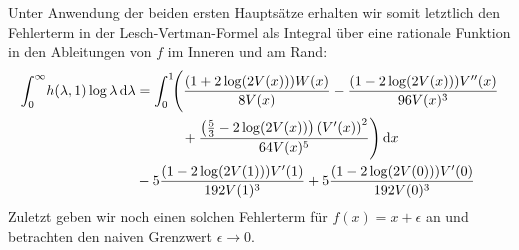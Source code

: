 Unter Anwendung der beiden ersten Hauptsätze erhalten wir somit letztlich den
Fehlerterm in der Lesch-Vertman-Formel als Integral über eine rationale Funktion
in den Ableitungen von $f$ im Inneren und am Rand:
\begin{align*}
  \Integ[\infty]{0}{\lambda}{
    h(\lambda, 1) \log\lambda
  }
  &=
  \Int{x}{\Biggl(\frac{(1 + 2 \log(2 V(x))) W(x)}{8 V(x)}
    - \frac{ (1 - 2 \log(2 V(x)))V''(x)}{96 V(x)^{3}} \\
    &\hphantom{=\int_0^1\Biggl(}\mathbin{+} \frac{\left(\frac{5}{3} - 2\log(2
    V(x))\right)\left(V'(x)\right)^{2}}{64 V(x)^{5}}\Biggr) } \\
&\mathbin- 5\frac{(1 - 2\log(2 V(1)))V'(1)}{192 V(1)^3}
+ 5\frac{(1 - 2 \log(2 V(0)))V'(0)}{192 V(0)^3}
\end{align*}
Zuletzt geben wir noch einen solchen Fehlerterm für $f(x) = x + \epsilon$ an und
betrachten den naiven Grenzwert $\epsilon \to 0$.
